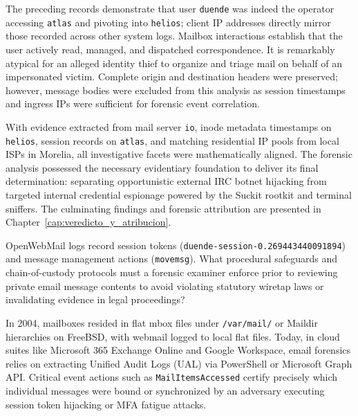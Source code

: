 \vspace{1em}

The preceding records demonstrate that user \texttt{duende} was indeed the operator accessing \texttt{atlas} and pivoting into \texttt{helios}; client IP addresses directly mirror those recorded across other system logs. Mailbox interactions establish that the user actively read, managed, and dispatched correspondence. It is remarkably atypical for an alleged identity thief to organize and triage mail on behalf of an impersonated victim. Complete origin and destination headers were preserved; however, message bodies were excluded from this analysis as session timestamps and ingress IPs were sufficient for forensic event correlation.

With evidence extracted from mail server \texttt{io}, inode metadata timestamps on \texttt{helios}, session records on \texttt{atlas}, and matching residential IP pools from local ISPs in Morelia, all investigative facets were mathematically aligned. The forensic analysis possessed the necessary evidentiary foundation to deliver its final determination: separating opportunistic external IRC botnet hijacking from targeted internal credential espionage powered by the Suckit rootkit and terminal sniffers. The culminating findings and forensic attribution are presented in Chapter~\ref{cap:veredicto_y_atribucion}.

\begin{retoforense}
OpenWebMail logs record session tokens (\texttt{duende-session-0.269443440091894}) and message management actions (\texttt{movemsg}). What procedural safeguards and chain-of-custody protocols must a forensic examiner enforce prior to reviewing private email message contents to avoid violating statutory wiretap laws or invalidating evidence in legal proceedings?
\end{retoforense}

\begin{perspectiva20}
In 2004, mailboxes resided in flat mbox files under \texttt{/var/mail/} or Maildir hierarchies on FreeBSD, with webmail logged to local flat files. Today, in cloud suites like Microsoft 365 Exchange Online and Google Workspace, email forensics relies on extracting Unified Audit Logs (UAL) via PowerShell or Microsoft Graph API. Critical event actions such as \texttt{MailItemsAccessed} certify precisely which individual messages were bound or synchronized by an adversary executing session token hijacking or MFA fatigue attacks.
\end{perspectiva20}

